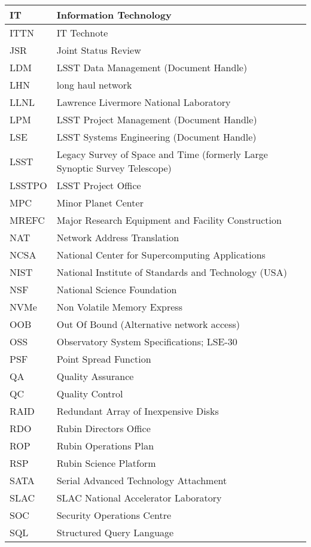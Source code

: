 \begin{longtable}{p{}p{}}
IT & Information Technology \\\hline
ITTN & IT Technote \\\hline
JSR & Joint Status Review \\\hline
LDM & LSST Data Management (Document Handle) \\\hline
LHN & long haul network \\\hline
LLNL & Lawrence Livermore National Laboratory \\\hline
LPM & LSST Project Management (Document Handle) \\\hline
LSE & LSST Systems Engineering (Document Handle) \\\hline
LSST & Legacy Survey of Space and Time (formerly Large Synoptic Survey Telescope) \\\hline
LSSTPO & LSST Project Office \\\hline
MPC & Minor Planet Center \\\hline
MREFC & Major Research Equipment and Facility Construction \\\hline
NAT & Network Address Translation \\\hline
NCSA & National Center for Supercomputing Applications \\\hline
NIST & National Institute of Standards and Technology (USA) \\\hline
NSF & National Science Foundation \\\hline
NVMe & Non Volatile Memory Express \\\hline
OOB & Out Of Bound (Alternative network access) \\\hline
OSS & Observatory System Specifications; LSE-30 \\\hline
PSF & Point Spread Function \\\hline
QA & Quality Assurance \\\hline
QC & Quality Control \\\hline
RAID & Redundant Array of Inexpensive Disks \\\hline
RDO & Rubin Directors Office \\\hline
ROP & Rubin Operations Plan \\\hline
RSP & Rubin Science Platform \\\hline
SATA & Serial Advanced Technology Attachment \\\hline
SLAC & SLAC National Accelerator Laboratory \\\hline
SOC & Security Operations Centre \\\hline
SQL & Structured Query Language \\\hline

\end{longtable}
